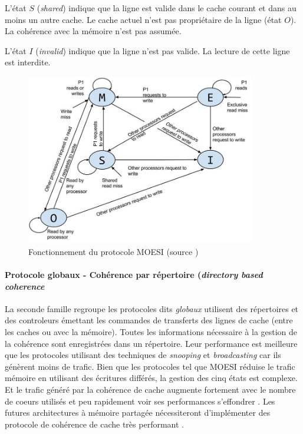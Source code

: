 L'état $S$ (\textit{shared}) indique que la ligne est valide dans le cache courant et dans au moins un autre cache. Le cache actuel n'est pas propriétaire de la ligne (état $O$). La cohérence avec la mémoire n'est pas assumée. 

L'état $I$ (\textit{invalid}) indique que la ligne n'est pas valide. La lecture de cette ligne est interdite.


\begin{figure}
    \center
    \includegraphics[width=10cm]{images/moesi.png}
    \caption{\label{pic:moesi} Fonctionnement du protocole MOESI (source \cite{Sayin2014})}
\end{figure}





\paragraph{Protocole globaux - Cohérence par répertoire (\textit{directory based coherence}}

La seconde famille regroupe les protocoles dits \textit{globaux} utilisent des répertoires et des controleurs émettant les commandes de transferts des lignes de cache (entre les caches ou avec la mémoire)\cite{tang1976cache}. Toutes les informations nécessaire à la gestion de la cohérence sont enregistrées dans un répertoire. Leur performance est meilleure que les protocoles utilisant des techniques de \textit{snooping} et \textit{broadcasting} car ils génèrent moins de trafic. Bien que les protocoles tel que MOESI réduise le trafic mémoire en utilisant des écritures différés, la gestion des cinq états est complexe. Et le trafic généré par la cohérence de cache augmente fortement avec le nombre de coeurs utilisés et peu rapidement voir ses performances s'effondrer \cite{liu2016protocoles}. Les futures architectures à mémoire partagée nécessiteront d'implémenter des protocole de cohérence de cache très performant  \cite{al2010snoopy}.



